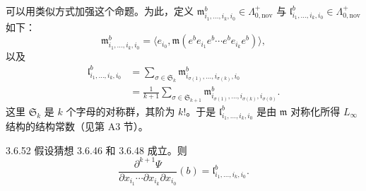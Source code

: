 可以用类似方式加强这个命题。为此，定义
$\mathfrak m^b_{i_1,\ldots,i_k,i_0}\in\Lambda^+_{0,\mathrm{nov}}$ 与
$\mathfrak l^b_{i_1,\ldots,i_k,i_0}\in\Lambda^+_{0,\mathrm{nov}}$ 如下：
\begin{equation}
  \mathfrak m^b_{i_1,\ldots,i_k,i_0}
  =\bigl\langle e_{i_0},
    \mathfrak m(e^b e_{i_1}e^b\cdots e^b e_{i_k}e^b)
   \bigr\rangle,
  \tag{3.6.51.1}\label{eq:3-6-51-1}
\end{equation}
以及
\begin{equation}
\begin{aligned}
  \mathfrak l^b_{i_1,\ldots,i_k,i_0}
  &=\sum_{\sigma\in\mathfrak S_k}
    \mathfrak m^b_{i_{\sigma(1)},\ldots,i_{\sigma(k)},i_0}\\
  &=\frac{1}{k+1}\sum_{\sigma\in\mathfrak S_{k+1}}
    \mathfrak m^b_{i_{\sigma(1)},\ldots,i_{\sigma(k)},i_{\sigma(0)}}.
\end{aligned}
\tag{3.6.51.2}\label{eq:3-6-51-2}
\end{equation}
这里 $\mathfrak S_k$ 是 $k$ 个字母的对称群，其阶为 $k!$。于是
$\mathfrak l^b_{i_1,\ldots,i_k,i_0}$ 是由 $\mathfrak m$ 对称化所得
$L_\infty$ 结构的结构常数（见第 A3 节）。

\begin{proposition}{3.6.52}\label{prop:3-6-52}
假设猜想 3.6.46 和 3.6.48 成立。则
\[
  \frac{\partial^{k+1}\Psi}
  {\partial x_{i_1}\cdots\partial x_{i_k}\partial x_{i_0}}(b)
  =\mathfrak l^b_{i_1,\ldots,i_k,i_0}.
\]
\end{proposition}

